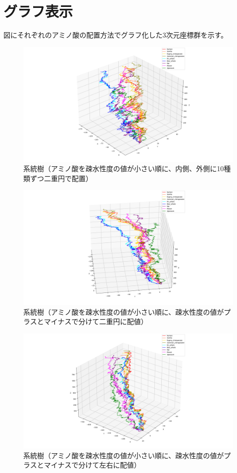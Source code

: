 \documentclass[a4paper,12pt]{jsreport}
\begin{document}
\newpage
\section{グラフ表示}
図にそれぞれのアミノ酸の配置方法でグラフ化した3次元座標群を示す。

\begin{figure}[H]
\centering
\includegraphics[width=120mm]{pic_graph_hydro1.png}
\caption{系統樹（アミノ酸を疎水性度の値が小さい順に、内側、外側に10種類ずつ二重円で配置）}
\end{figure}

\begin{figure}[H]
\centering
\includegraphics[width=120mm]{pic_graph_hydro2.png}
\caption{系統樹（アミノ酸を疎水性度の値が小さい順に、疎水性度の値がプラスとマイナスで分けて二重円に配値）}
\end{figure}

\begin{figure}[H]
\centering
\includegraphics[width=120mm]{pic_graph_hydro3.png}
\caption{系統樹（アミノ酸を疎水性度の値が小さい順に、疎水性度の値がプラスとマイナスで分けて左右に配値）}
\end{figure}
\end{document}
